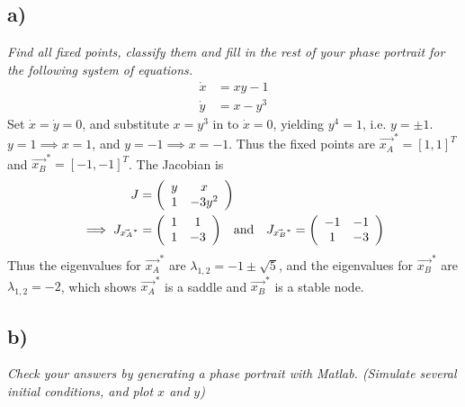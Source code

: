 \documentclass[12pt]{article}
\begin{document}
\subsection*{ a)}
\emph{Find all fixed points, classify them and fill in the rest of your phase portrait for the following system of equations.}
\begin{align*}
	\dot{x} &= xy - 1 \\
	\dot{y} &= x - y^3
\end{align*}
Set $\dot{x} = \dot{y} = 0$, and substitute $x = y^3$ in to $\dot{x} = 0$, yielding $y^4 = 1$, i.e. $y = \pm 1$.  $y = 1 \implies x = 1$, and $y = -1 \implies x = -1$.  Thus the fixed points are $\vec{x_A}^* = [1,1]^T$ and $\vec{x_B}^* = [-1,-1]^T$.  The Jacobian is
\begin{align*}
	J &= \qty(\begin{array}{cc}
		y & x \\
		1 & -3y^2
	\end{array}) \\
	\implies J_{\vec{x_A}^*} &= \qty(\begin{array}{cc}
		1 & 1 \\
		1 & -3
	\end{array})\ \ \ \text{and}\ \ \ J_{\vec{x_B}^*} = \qty(\begin{array}{cc}
		-1 & -1 \\
		1 & -3
	\end{array})
\end{align*}
Thus the eigenvalues for $\vec{x_A}^*$ are $\lambda_{1,2} = -1 \pm \sqrt{5}$, and the eigenvalues for $\vec{x_B}^*$ are $\lambda_{1,2} = -2$, which shows $\vec{x_A}^*$ is a saddle and $\vec{x_B}^*$ is a stable node.

\subsection*{ b)}
\emph{Check your answers by generating a phase portrait with Matlab.  (Simulate several initial conditions, and plot $x$ and $y$)}
\end{document}
